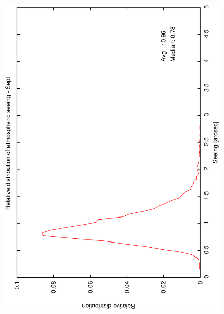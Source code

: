 {{\begin{figure}[htbp]
\begin{center}
{   \includegraphics[scale=0.25, angle=-90]{figures/ecs/corr_see_dist_sep.eps}
  }
 \subfigure[] {
   \label{fig:see_dist_oct}
}
\end{center}
\end{figure}}}
